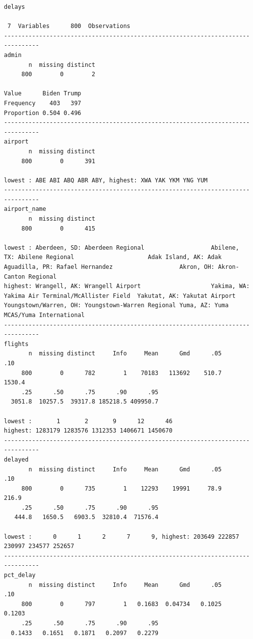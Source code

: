 \documentclass[
  letterpaper,
  DIV=11,
  numbers=noendperiod]{scrartcl}
\begin{document}
\begin{verbatim}
delays 

 7  Variables      800  Observations
--------------------------------------------------------------------------------
admin 
       n  missing distinct 
     800        0        2 
                      
Value      Biden Trump
Frequency    403   397
Proportion 0.504 0.496
--------------------------------------------------------------------------------
airport 
       n  missing distinct 
     800        0      391 

lowest : ABE ABI ABQ ABR ABY, highest: XWA YAK YKM YNG YUM
--------------------------------------------------------------------------------
airport_name 
       n  missing distinct 
     800        0      415 

lowest : Aberdeen, SD: Aberdeen Regional                   Abilene, TX: Abilene Regional                     Adak Island, AK: Adak                             Aguadilla, PR: Rafael Hernandez                   Akron, OH: Akron-Canton Regional                 
highest: Wrangell, AK: Wrangell Airport                    Yakima, WA: Yakima Air Terminal/McAllister Field  Yakutat, AK: Yakutat Airport                      Youngstown/Warren, OH: Youngstown-Warren Regional Yuma, AZ: Yuma MCAS/Yuma International           
--------------------------------------------------------------------------------
flights 
       n  missing distinct     Info     Mean      Gmd      .05      .10 
     800        0      782        1    70183   113692    510.7   1530.4 
     .25      .50      .75      .90      .95 
  3051.8  10257.5  39317.8 185218.5 409950.7 

lowest :       1       2       9      12      46
highest: 1283179 1283576 1312353 1406671 1450670
--------------------------------------------------------------------------------
delayed 
       n  missing distinct     Info     Mean      Gmd      .05      .10 
     800        0      735        1    12293    19991     78.9    216.9 
     .25      .50      .75      .90      .95 
   444.8   1650.5   6903.5  32810.4  71576.4 

lowest :      0      1      2      7      9, highest: 203649 222857 230997 234577 252657
--------------------------------------------------------------------------------
pct_delay 
       n  missing distinct     Info     Mean      Gmd      .05      .10 
     800        0      797        1   0.1683  0.04734   0.1025   0.1203 
     .25      .50      .75      .90      .95 
  0.1433   0.1651   0.1871   0.2097   0.2279 


\end{verbatim}
\end{document}
